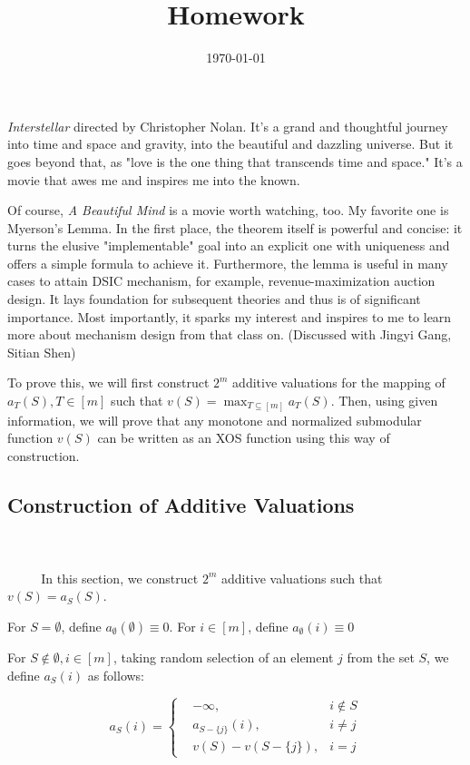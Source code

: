 \documentclass[oneside,solution]{seu-ml-assign}
\title{Homework}
\author{}
\date{\today}
\begin{document}
\maketitle
\emph{Interstellar} directed by Christopher Nolan. It's a grand and
thoughtful journey into time and space and gravity, into the beautiful
and dazzling universe. But it goes beyond that, as "love is the one
thing that transcends time and space." It's a movie that awes me and
inspires me into the known.

Of course, \emph{A Beautiful Mind} is a movie worth watching, too.
My favorite one is Myerson's Lemma. In the first place, the theorem
itself is powerful and concise: it turns the elusive "implementable"
goal into an explicit one with uniqueness and offers a simple formula to
achieve it. Furthermore, the lemma is useful
in many cases to attain DSIC mechanism, for example, revenue-maximization auction design. It  lays foundation for subsequent
theories and thus is of significant
importance. Most importantly, it sparks my interest and inspires to me
to learn more about mechanism design from that class on.
(Discussed with Jingyi Gang, Sitian Shen)


To prove this, we will first construct \(2^m\) additive valuations for
the mapping of \(a_T(S), T\in [m]\) such that
\(v(S)=\max_{T\subseteq[m]}a_{T}(S)\). Then, using given information, we
will prove that any monotone and normalized submodular function \(v(S)\)
can be written as an XOS function using this way of construction.
\subsection{Construction of Additive
Valuations}
\\ \hspace*{\fill} \\
$\text{        }\quad\text{  }$
In this section, we construct \(2^m\) additive valuations such that
\(v(S)=a_{S}(S)\).

For \(S=\emptyset\), define \(a_{\emptyset}(\emptyset)\equiv0\). For \(i\in[m]\),
define \(a_{\emptyset}(i)\equiv0\)

For \(S\notin \emptyset,i\in[m]\), taking random selection of an element
\(j\) from the set \(S\), we define \(a_{S}(i)\) as follows:

\begin{equation}
a_S(i)=\left\{
\begin{aligned}
&-\infty,  & i\notin S \\
&a_{S-\{j\}}(i)  ,& i \neq j \\
&v(S)-v(S-\{j\}),& i=j
\end{aligned}
\right.
\end{equation}
\end{document}
